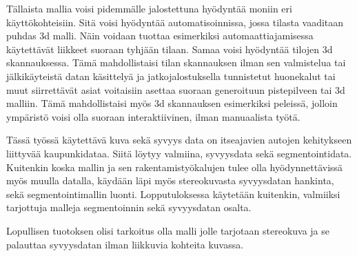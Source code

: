 Tällaista mallia voisi pidemmälle jalostettuna hyödyntää moniin eri käyttökohteisiin.
Sitä voisi hyödyntää automatisoinnissa, jossa tilasta vaaditaan puhdas 3d malli.
Näin voidaan tuottaa esimerkiksi automaattiajamisessa käytettävät liikkeet suoraan tyhjään tilaan.
Samaa voisi hyödyntää tilojen 3d skannauksessa.
Tämä mahdollistaisi tilan skannauksen ilman sen valmistelua tai jälkikäyteistä datan käsittelyä ja jatkojalostuksella tunnistetut huonekalut tai muut siirrettävät asiat voitaisiin asettaa suoraan generoituun pistepilveen tai 3d malliin.
Tämä mahdollistaisi myös 3d skannauksen esimerkiksi peleissä,
jolloin ympäristö voisi olla suoraan interaktiivinen,
ilman manuaalista työtä. 

Tässä työssä käytettävä kuva sekä syvyys data on itseajavien autojen kehitykseen liittyvää kaupunkidataa. 
Siitä löytyy valmiina, syvyysdata sekä segmentointidata.
Kuitenkin koska mallin ja sen rakentamistyökalujen tulee olla hyödynnettävissä myös muulla datalla,
käydään läpi myös stereokuvasta syvyysdatan hankinta,
sekä segmentointimallin luonti. Lopputuloksessa käytetään kuitenkin,
valmiiksi tarjottuja malleja segmentoinnin sekä syvyysdatan osalta.

Lopullisen tuotoksen olisi tarkoitus olla malli jolle tarjotaan stereokuva ja se palauttaa syvyysdatan ilman liikkuvia kohteita kuvassa.
